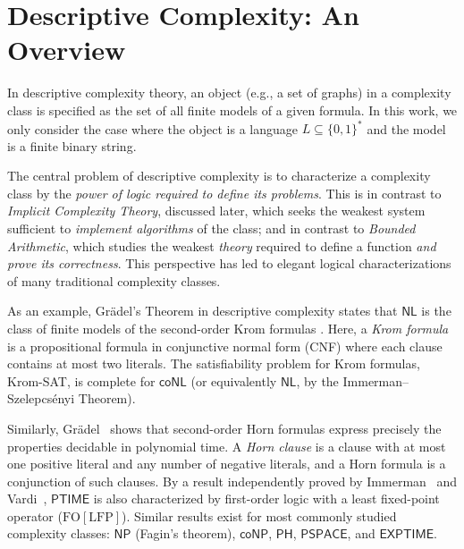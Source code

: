
\section{Descriptive Complexity: An Overview}

In descriptive complexity theory, an object (e.g., a set of graphs) in
a complexity class is specified as the set of all finite models of a given
formula. In this work, we only consider the case where the object is a language 
\(L \subseteq \{0,1\}^*\) and the model is a finite binary string.

The central problem of descriptive complexity is to characterize a
complexity class by the \emph{power of logic required to define its problems}.
This is in contrast to \emph{Implicit Complexity Theory}, discussed later,
which seeks the weakest system sufficient to \emph{implement algorithms}
of the class; and in contrast to \emph{Bounded Arithmetic}, which studies
the weakest \emph{theory} required to define a function \emph{and prove its correctness}.
This perspective has led to elegant logical characterizations of many traditional
complexity classes.

As an example, Grädel’s Theorem in descriptive complexity states that
\(\mathsf{NL}\) is the class of finite models of the second-order Krom formulas
\cite{GRADEL199235}.
Here, a \emph{Krom formula} is a propositional
formula in conjunctive normal form (CNF) where each clause contains at most
two literals. The satisfiability problem for Krom formulas, Krom-SAT, is
complete for \(\mathsf{coNL}\) (or equivalently \(\mathsf{NL}\), by the Immerman–Szelepcsényi
Theorem).

Similarly, Grädel~\cite{GRADEL199235} shows that second-order Horn formulas
express precisely the properties decidable in polynomial time.
A \emph{Horn clause} is a clause with at most one positive literal and any number
of negative literals, and a Horn formula is a conjunction of such clauses.
By a result independently proved by Immerman~\cite{IMMERMAN198686}
and Vardi~\cite{10.1145/800070.802186},
\(\mathsf{PTIME}\) is also characterized by first-order logic with a least fixed-point operator
(\(\mathrm{FO[LFP]}\)).
Similar results exist for most commonly studied complexity classes:
\(\mathsf{NP}\) (Fagin's theorem), \(\mathsf{coNP}\), \(\mathsf{PH}\), \(\mathsf{PSPACE}\), and \(\mathsf{EXPTIME}\).

